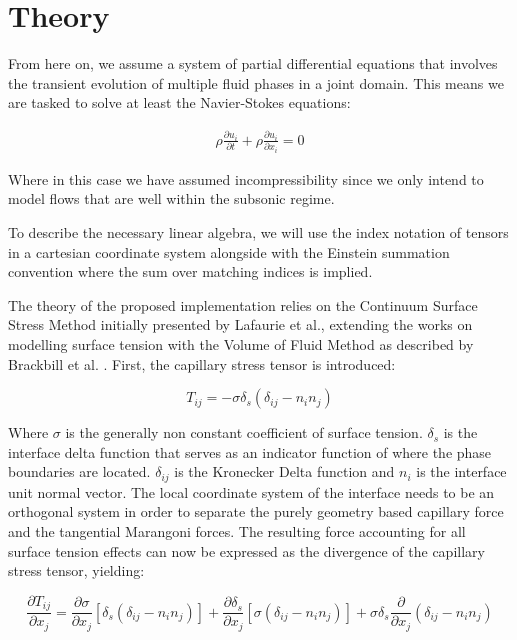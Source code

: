 \documentclass[conference,final]{IEEEtran}
\begin{document}
\section{Theory}

From here on, we assume a system of partial differential equations that involves the transient evolution of multiple fluid phases in a joint domain. This means we are tasked to solve at least the Navier-Stokes equations:

\begin{align}
  \rho \frac{\partial  u_{i}}{\partial t} + \rho \frac{\partial u_{i}}{\partial x_{i}} = 0
\end{align}

Where in this case we have assumed incompressibility since we only intend to model flows that are well within the subsonic regime.

To describe the necessary linear algebra, we will use the index notation of tensors in a cartesian coordinate system alongside with the Einstein summation convention where the sum over matching indices is implied.

The theory of the proposed implementation relies on the Continuum Surface Stress Method initially presented by Lafaurie et al., extending the works on modelling surface tension with the Volume of Fluid Method as described by Brackbill et al. \cite{lafaurieModellingMergingFragmentation1994,brackbillContinuumMethodModeling1992}.
 First, the capillary stress tensor is introduced:

\begin{equation}
    T_{ij} = - \sigma \delta_s (\delta_{ij} - n_i n_j)
\end{equation}

Where $\sigma$ is the generally non constant coefficient of surface tension. $\delta_s$ is the interface delta function that serves as an indicator function of where the phase boundaries are located. $\delta_{ij}$ is the Kronecker Delta function and $n_i$ is the interface unit normal vector. The local coordinate system of the interface needs to be an orthogonal system in order to separate the purely geometry based capillary force and the tangential Marangoni forces.
The resulting force accounting for all surface tension effects can now be expressed as the divergence of the capillary stress tensor, yielding:

\begin{equation}
    \frac{\partial T_{ij}}{\partial x_j} = \frac{\partial \sigma}{\partial x_j} [\delta_s(\delta_{ij} - n_i n_j)] + \frac{\partial \delta_s}{\partial x_j} [\sigma (\delta_{ij} - n_i n_j)] + \sigma \delta_s \frac{\partial}{\partial x_j} (\delta_{ij} - n_i n_j) \label{eq:stress-tensor}
\end{equation}
\end{document}
